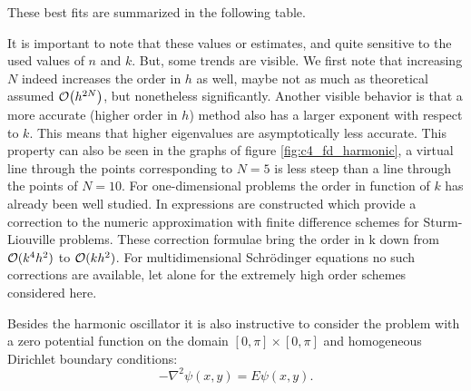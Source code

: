 These best fits are summarized in the following table.
\begin{center}
    
\end{center}

It is important to note that these values or estimates, and quite sensitive to the used values of $n$ and $k$. But, some trends are visible. We first note that increasing $N$ indeed increases the order in $h$ as well, maybe not as much as theoretical assumed $\OO\mleft(h^{2N}\mright)$, but nonetheless significantly. Another visible behavior is that a more accurate (higher order in $h$) method also has a larger exponent with respect to $k$. This means that higher eigenvalues are asymptotically less accurate. This property can also be seen in the graphs of figure \ref{fig:c4_fd_harmonic}, a virtual line through the points corresponding to $N = 5$ is less steep than a line through the points of $N = 10$. For one-dimensional problems the order in function of $k$ has already been well studied. In \cite{paine_correction_1981} expressions are constructed which provide a correction to the numeric approximation with finite difference schemes for Sturm-Liouville problems. These correction formulae bring the order in k down from $\operatorname{\mathcal{O}}(k^4h^2)$ to $\operatorname{\mathcal{O}}(k h^2)$. For multidimensional Schrödinger equations no such corrections are available, let alone for the extremely high order schemes considered here.

Besides the harmonic oscillator it is also instructive to consider the problem with a zero potential function on the domain $[0, \pi] \times [0, \pi]$ and homogeneous Dirichlet boundary conditions:
\begin{equation}\label{equ:c4_fd_zero}
    -\nabla^2 \psi(x, y) = E \psi(x, y) \text{.}
\end{equation}


